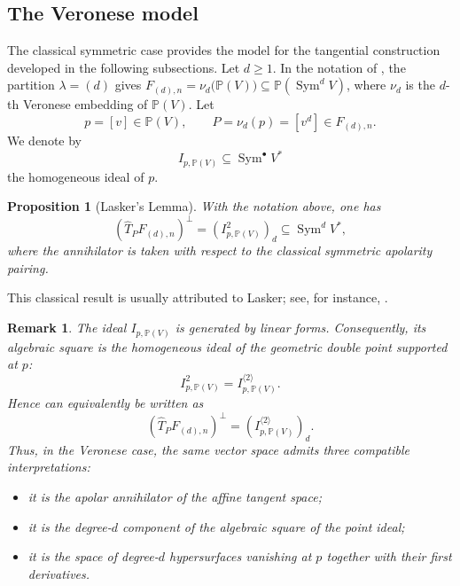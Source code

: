\documentclass[a4paper,reqno]{amsart}
\theoremstyle{plainnopunct}
\newtheorem{proposition}[proposition]{Proposition}
\theoremstyle{definitionnopunct}
\newtheorem{remark}[remark]{Remark}
\renewcommand{\P}{\mathbb{P}}
\newcommand{\Sym}{\operatorname{Sym}}
\begin{document}
\subsection{The Veronese model}
\label{subsect: Veronese model}

The classical symmetric case provides the model for the tangential construction developed in the following subsections. Let $d\geq1$. In the notation of , the partition $\lambda=(d)$ gives $F_{(d),n} = \nu_d\bigl(\P(V)\bigr)
\subseteq \P(\Sym^dV)$, where $\nu_d$ is the $d$-th Veronese embedding of $\P(V)$.
Let
\[
p=[v]\in\P(V),
\qquad
P=\nu_d(p)=[v^d]\in F_{(d),n}.
\]
We denote by
\[
I_{p,\P(V)}
\subseteq
\Sym^\bullet V^*
\]
the homogeneous ideal of $p$.

\begin{proposition}[Lasker's Lemma]
\label{prop: Lasker lemma}
With the notation above, one has
\[\left(
\widehat T_PF_{(d),n}
\right)^\perp
=
\left(
I_{p,\P(V)}^2
\right)_d
\subseteq
\Sym^dV^*,\]
where the annihilator is taken with respect to the classical symmetric apolarity pairing.
\end{proposition}

This classical result is usually attributed to Lasker; see, for instance, \cite{Ottaviani2013}.

\begin{remark}
\label{rem: Veronese algebraic geometric squares}
The ideal $I_{p,\P(V)}$ is generated by linear forms. Consequently,  its algebraic square is the homogeneous ideal of the geometric double point supported at $p$:\[I_{p,\P(V)}^2
=
I_{p,\P(V)}^{\langle2\rangle}.
\]
Hence  can equivalently be written as
\[\left(
\widehat T_PF_{(d),n}
\right)^\perp
=
\left(
I_{p,\P(V)}^{\langle2\rangle}
\right)_d.
\]
Thus, in the Veronese case, the same vector space admits three compatible interpretations:

\begin{itemize}
    \item it is the apolar annihilator of the affine tangent space;
    \item it is the degree-$d$ component of the algebraic square of the point ideal;
    \item it is the space of degree-$d$ hypersurfaces vanishing at  $p$ together with their first derivatives.
\end{itemize}
\end{remark}
\end{document}
